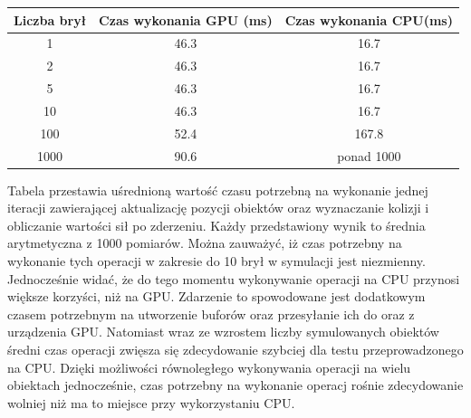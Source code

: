 \begin{tabular}{|c|c|c|}
\hline
Liczba brył & Czas wykonania GPU (ms) & Czas wykonania CPU(ms) \\
\hline
1 & 46.3 & 16.7\\
2 & 46.3 & 16.7\\
5 & 46.3 & 16.7\\
10 & 46.3 & 16.7\\
100 & 52.4 & 167.8\\
1000 & 90.6 & ponad 1000\\
\hline
\end{tabular}
\newline
\newline
\newline
Tabela przestawia uśrednioną wartość czasu potrzebną na wykonanie jednej iteracji zawierającej aktualizację pozycji obiektów oraz wyznaczanie kolizji i obliczanie wartości sił po zderzeniu. Każdy przedstawiony wynik to średnia arytmetyczna z 1000 pomiarów. Można zauważyć, iż czas potrzebny na wykonanie tych operacji w zakresie do 10 brył w symulacji jest niezmienny. Jednocześnie widać, że do tego momentu wykonywanie operacji na CPU przynosi większe korzyści, niż na GPU. Zdarzenie to spowodowane jest dodatkowym czasem potrzebnym na utworzenie buforów oraz przesyłanie ich do oraz z urządzenia GPU. Natomiast wraz ze wzrostem liczby symulowanych obiektów średni czas operacji zwięsza się zdecydowanie szybciej dla testu przeprowadzonego na CPU. Dzięki możliwości równoległego wykonywania operacji na wielu obiektach jednocześnie, czas potrzebny na wykonanie operacj rośnie zdecydowanie wolniej niż ma to miejsce przy wykorzystaniu CPU.\\